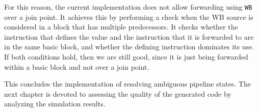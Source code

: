 For this reason, the current implementation does not allow forwarding using \texttt{WB} over a join point. It achieves this by performing a check when the WB source is considered in a block that has multiple predecessors. It checks whether the instruction that defines the value and the instruction that it is forwarded to are in the same basic block, and whether the defining instruction dominates its use. If both conditions hold, then we are still good, since it is just being forwarded within a basic block and not over a join point.

This concludes the implementation of resolving ambiguous pipeline states. The next chapter is devoted to assessing the quality of the generated code by analyzing the simulation results.



 
 
 
